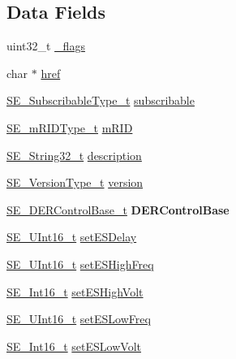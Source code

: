 \subsection*{Data Fields}
\begin{DoxyCompactItemize}
\item 
uint32\+\_\+t \hyperlink{group__DefaultDERControl_ga08511ed7222a49228f0f66ca52404d0a}{\+\_\+flags}
\item 
char $\ast$ \hyperlink{group__DefaultDERControl_ga2b9afee29d9b310f43c79c02784aec36}{href}
\item 
\hyperlink{group__SubscribableType_ga5c41f553d369710ed34619266bf2551e}{S\+E\+\_\+\+Subscribable\+Type\+\_\+t} \hyperlink{group__DefaultDERControl_gaa16d98b386c11e56b2fde9a1c3c35847}{subscribable}
\item 
\hyperlink{group__mRIDType_gac74622112f3a388a2851b2289963ba5e}{S\+E\+\_\+m\+R\+I\+D\+Type\+\_\+t} \hyperlink{group__DefaultDERControl_ga9fd3df30cd25ccd0cb3cf1d0f52cefc8}{m\+R\+ID}
\item 
\hyperlink{group__String32_gac9f59b06b168b4d2e0d45ed41699af42}{S\+E\+\_\+\+String32\+\_\+t} \hyperlink{group__DefaultDERControl_gacf738db006103c920780851a581a7029}{description}
\item 
\hyperlink{group__VersionType_ga4b8d27838226948397ed99f67d46e2ae}{S\+E\+\_\+\+Version\+Type\+\_\+t} \hyperlink{group__DefaultDERControl_ga2f2e8ea1c9828a1cdbc5080cd39e008f}{version}
\item 
\hyperlink{structSE__DERControlBase__t}{S\+E\+\_\+\+D\+E\+R\+Control\+Base\+\_\+t} {\bfseries D\+E\+R\+Control\+Base}
\item 
\hyperlink{group__UInt16_gac68d541f189538bfd30cfaa712d20d29}{S\+E\+\_\+\+U\+Int16\+\_\+t} \hyperlink{group__DefaultDERControl_gaa0f2150f5f549dc78c64e2c247e49347}{set\+E\+S\+Delay}
\item 
\hyperlink{group__UInt16_gac68d541f189538bfd30cfaa712d20d29}{S\+E\+\_\+\+U\+Int16\+\_\+t} \hyperlink{group__DefaultDERControl_ga9b1cda2efced0f19df2502dab08ce4b0}{set\+E\+S\+High\+Freq}
\item 
\hyperlink{group__Int16_ga0d600c7df811a7d4b4816e8965877690}{S\+E\+\_\+\+Int16\+\_\+t} \hyperlink{group__DefaultDERControl_ga818efdf68d11fc69e009abc026a0f981}{set\+E\+S\+High\+Volt}
\item 
\hyperlink{group__UInt16_gac68d541f189538bfd30cfaa712d20d29}{S\+E\+\_\+\+U\+Int16\+\_\+t} \hyperlink{group__DefaultDERControl_ga27fcac98cfffed69acb39dbefffaac4b}{set\+E\+S\+Low\+Freq}
\item 
\hyperlink{group__Int16_ga0d600c7df811a7d4b4816e8965877690}{S\+E\+\_\+\+Int16\+\_\+t} \hyperlink{group__DefaultDERControl_ga105454967aecd8e505c6456389d63e3e}{set\+E\+S\+Low\+Volt}

\end{DoxyCompactItemize}
